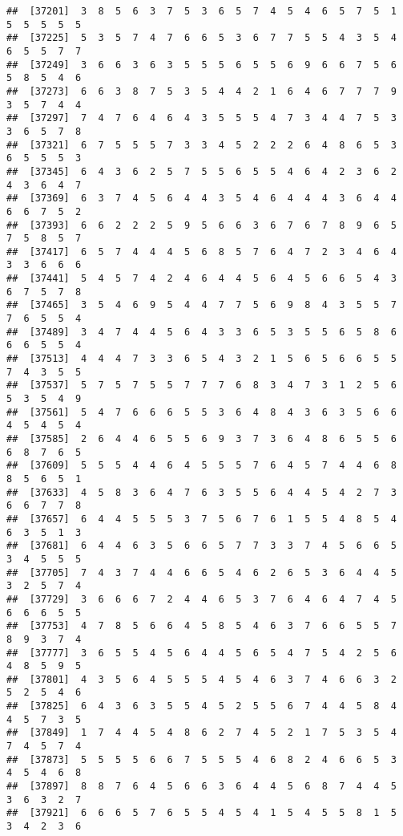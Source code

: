 \documentclass[
]{book}
\begin{document}
\begin{verbatim}
##  [37201]  3  8  5  6  3  7  5  3  6  5  7  4  5  4  6  5  7  5  1  5  5  5  5  5
##  [37225]  5  3  5  7  4  7  6  6  5  3  6  7  7  5  5  4  3  5  4  6  5  5  7  7
##  [37249]  3  6  6  3  6  3  5  5  5  6  5  5  6  9  6  6  7  5  6  5  8  5  4  6
##  [37273]  6  6  3  8  7  5  3  5  4  4  2  1  6  4  6  7  7  7  9  3  5  7  4  4
##  [37297]  7  4  7  6  4  6  4  3  5  5  5  4  7  3  4  4  7  5  3  3  6  5  7  8
##  [37321]  6  7  5  5  5  7  3  3  4  5  2  2  2  6  4  8  6  5  3  6  5  5  5  3
##  [37345]  6  4  3  6  2  5  7  5  5  6  5  5  4  6  4  2  3  6  2  4  3  6  4  7
##  [37369]  6  3  7  4  5  6  4  4  3  5  4  6  4  4  4  3  6  4  4  6  6  7  5  2
##  [37393]  6  6  2  2  2  5  9  5  6  6  3  6  7  6  7  8  9  6  5  7  5  8  5  7
##  [37417]  6  5  7  4  4  4  5  6  8  5  7  6  4  7  2  3  4  6  4  3  3  6  6  6
##  [37441]  5  4  5  7  4  2  4  6  4  4  5  6  4  5  6  6  5  4  3  6  7  5  7  8
##  [37465]  3  5  4  6  9  5  4  4  7  7  5  6  9  8  4  3  5  5  7  7  6  5  5  4
##  [37489]  3  4  7  4  4  5  6  4  3  3  6  5  3  5  5  6  5  8  6  6  6  5  5  4
##  [37513]  4  4  4  7  3  3  6  5  4  3  2  1  5  6  5  6  6  5  5  7  4  3  5  5
##  [37537]  5  7  5  7  5  5  7  7  7  6  8  3  4  7  3  1  2  5  6  5  3  5  4  9
##  [37561]  5  4  7  6  6  6  5  5  3  6  4  8  4  3  6  3  5  6  6  4  5  4  5  4
##  [37585]  2  6  4  4  6  5  5  6  9  3  7  3  6  4  8  6  5  5  6  6  8  7  6  5
##  [37609]  5  5  5  4  4  6  4  5  5  5  7  6  4  5  7  4  4  6  8  8  5  6  5  1
##  [37633]  4  5  8  3  6  4  7  6  3  5  5  6  4  4  5  4  2  7  3  6  6  7  7  8
##  [37657]  6  4  4  5  5  5  3  7  5  6  7  6  1  5  5  4  8  5  4  6  3  5  1  3
##  [37681]  6  4  4  6  3  5  6  6  5  7  7  3  3  7  4  5  6  6  5  3  4  5  5  5
##  [37705]  7  4  3  7  4  4  6  6  5  4  6  2  6  5  3  6  4  4  5  3  2  5  7  4
##  [37729]  3  6  6  6  7  2  4  4  6  5  3  7  6  4  6  4  7  4  5  6  6  6  5  5
##  [37753]  4  7  8  5  6  6  4  5  8  5  4  6  3  7  6  6  5  5  7  8  9  3  7  4
##  [37777]  3  6  5  5  4  5  6  4  4  5  6  5  4  7  5  4  2  5  6  4  8  5  9  5
##  [37801]  4  3  5  6  4  5  5  5  4  5  4  6  3  7  4  6  6  3  2  5  2  5  4  6
##  [37825]  6  4  3  6  3  5  5  4  5  2  5  5  6  7  4  4  5  8  4  4  5  7  3  5
##  [37849]  1  7  4  4  5  4  8  6  2  7  4  5  2  1  7  5  3  5  4  7  4  5  7  4
##  [37873]  5  5  5  5  6  6  7  5  5  5  4  6  8  2  4  6  6  5  3  4  5  4  6  8
##  [37897]  8  8  7  6  4  5  6  6  3  6  4  4  5  6  8  7  4  4  5  3  6  3  2  7
##  [37921]  6  6  6  5  7  6  5  5  4  5  4  1  5  4  5  5  8  1  5  3  4  2  3  6

\end{verbatim}
\end{document}
